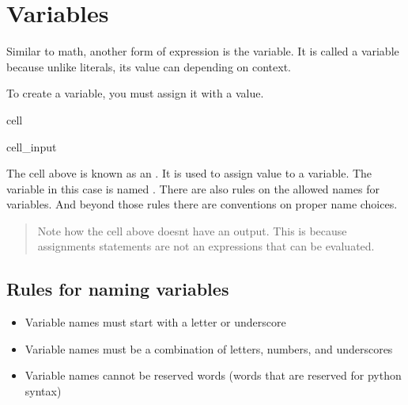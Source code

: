 \documentclass[letterpaper,10pt,english]{jupyterBook}
\begin{document}
\section{Variables}
\label{\detokenize{expressions:variables}}
\sphinxAtStartPar
Similar to math, another form of expression is the variable. It is called a variable because unlike literals, its value can  depending on context.

\sphinxAtStartPar
To create a variable, you must assign it with a value.

\begin{sphinxuseclass}{cell}\begin{sphinxVerbatimInput}

\begin{sphinxuseclass}{cell_input}
\begin{sphinxVerbatim}[commandchars=\\\{\}]
  
\end{sphinxVerbatim}

\end{sphinxuseclass}\end{sphinxVerbatimInput}

\end{sphinxuseclass}
\sphinxAtStartPar
The cell above is known as an . It is used to assign value to a variable. The variable in this case is named . There are also rules on the allowed names for variables. And beyond those rules there are conventions on proper name choices.
\begin{quote}

\sphinxAtStartPar
Note how the cell above doesnt have an output. This is because assignments statements are not an expressions that can be evaluated.
\end{quote}


\subsection{Rules for naming variables}
\label{\detokenize{expressions:rules-for-naming-variables}}\begin{itemize}
\item {} 
\sphinxAtStartPar
Variable names must start with a letter or underscore

\item {} 
\sphinxAtStartPar
Variable names must be a combination of letters, numbers, and underscores

\item {} 
\sphinxAtStartPar
Variable names cannot be reserved words (words that are reserved for python syntax)

\end{itemize}
\end{document}
